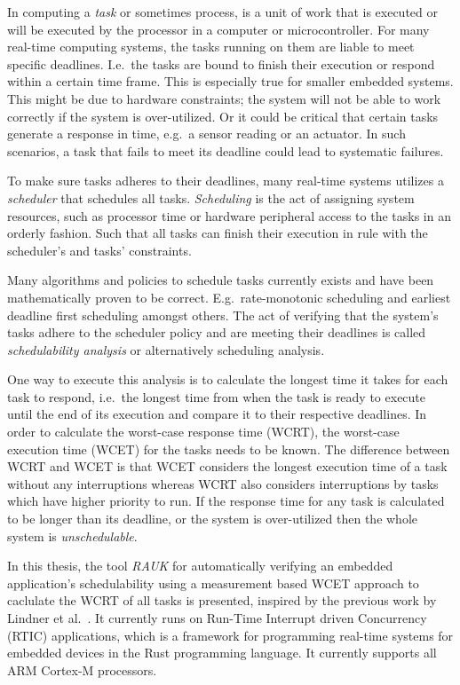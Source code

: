 In computing a \emph{task} or sometimes process, is a unit of work that is
executed or will be executed by the processor in a computer or microcontroller.
For many real-time computing systems, the tasks running on them are liable to
meet specific deadlines. I.e.\ the tasks are bound to finish their execution or
respond within a certain time frame. This is especially true for smaller
embedded systems. This might be due to hardware constraints; the system will
not be able to work correctly if the system is over-utilized. Or it could be
critical that certain tasks generate a response in time, e.g.\ a sensor reading
or an actuator. In such scenarios, a task that fails to meet its deadline could
lead to systematic failures.

To make sure tasks adheres to their deadlines, many real-time systems utilizes
a \emph{scheduler} that schedules all tasks. \emph{Scheduling} is the act of
assigning system resources, such as processor time or hardware peripheral
access to the tasks in an orderly fashion. Such that all tasks can finish their
execution in rule with the scheduler's and tasks' constraints.

Many algorithms and policies to schedule tasks currently exists and have been
mathematically proven to be correct.  E.g.\ rate-monotonic
scheduling\cite{ratemonotonic} and earliest deadline first scheduling\cite{edf}
amongst others.  The act of verifying that the system's tasks adhere to the
scheduler policy and are meeting their deadlines is called \emph{schedulability
analysis} or alternatively scheduling analysis.

One way to execute this analysis is to calculate the longest time it takes for
each task to respond, i.e.\ the longest time from when the task is ready to
execute until the end of its execution and compare it to their respective
deadlines.  In order to calculate the worst-case response time (WCRT), the
worst-case execution time (WCET) for the tasks needs to be known. The
difference between WCRT and WCET is that WCET considers the longest execution
time of a task without any interruptions whereas WCRT also considers
interruptions by tasks which have higher priority to
run\cite{hardrealtimecomputingsystems}. If the response time for any task is
calculated to be longer than its deadline, or the system is over-utilized then
the whole system is \emph{unschedulable}.

In this thesis, the tool \emph{RAUK} for automatically verifying an embedded
application's schedulability using a measurement based WCET approach to
caclulate the WCRT of all tasks is presented, inspired by the previous work by
Lindner et al.\ \cite{lindner}. It currently runs on Run-Time Interrupt driven
Concurrency (RTIC) applications, which is a framework for programming real-time
systems for embedded devices in the Rust programming language. It currently
supports all ARM Cortex-M processors.

